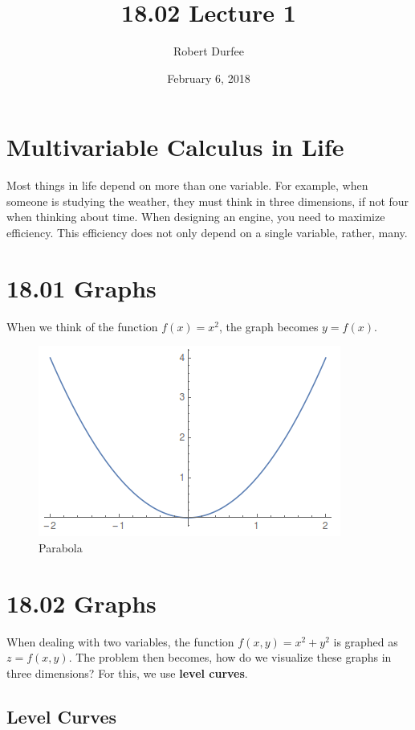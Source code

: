 \documentclass{article}
\title{ 18.02 Lecture 1 }
\author{ Robert Durfee }
\date{ February 6, 2018 }
\begin{document}
\maketitle

\section{ Multivariable Calculus in Life }

Most things in life depend on more than one variable. For example, when someone
is studying the weather, they must think in three dimensions, if not four when
thinking about time. When designing an engine, you need to maximize efficiency.
This efficiency does not only depend on a single variable, rather, many.

\section{ 18.01 Graphs }

When we think of the function $ f(x) = x^{2} $, the graph becomes $ y = f(x) $.

\begin{figure}[H]
  \centering
  \includegraphics[scale=0.75]{"Parabola"}
  \caption{Parabola}
\end{figure}

\section{ 18.02 Graphs }

When dealing with two variables, the function $ f(x, y) = x^{2} + y^{2} $ is
graphed as $ z = f(x, y) $. The problem then becomes, how do we visualize these
graphs in three dimensions? For this, we use \textbf{level curves}.

\subsection{ Level Curves }
\end{document}
